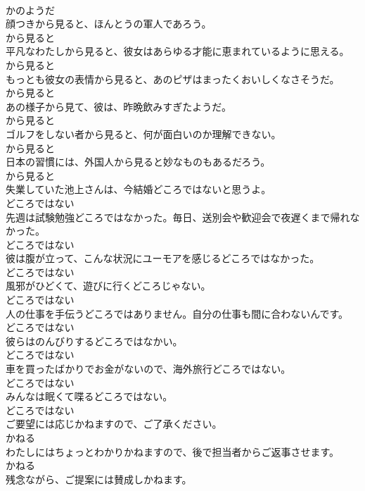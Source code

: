 \documentclass[8pt]{extreport}
\begin{document}
\begin{CJK}{UTF8}{min}
\\	かのようだ
\\	顔つきから見ると、ほんとうの軍人であろう。	
\\	から見ると
\\	平凡なわたしから見ると、彼女はあらゆる才能に恵まれているように思える。	
\\	から見ると
\\	もっとも彼女の表情から見ると、あのピザはまったくおいしくなさそうだ。	
\\	から見ると
\\	あの様子から見て、彼は、昨晩飲みすぎたようだ。	
\\	から見ると
\\	ゴルフをしない者から見ると、何が面白いのか理解できない。	
\\	から見ると
\\	日本の習慣には、外国人から見ると妙なものもあるだろう。	
\\	から見ると
\\	失業していた池上さんは、今結婚どころではないと思うよ。	
\\	どころではない
\\	先週は試験勉強どころではなかった。毎日、送別会や歓迎会で夜遅くまで帰れなかった。	
\\	どころではない
\\	彼は腹が立って、こんな状況にユーモアを感じるどころではなかった。	
\\	どころではない
\\	風邪がひどくて、遊びに行くどころじゃない。	
\\	どころではない
\\	人の仕事を手伝うどころではありません。自分の仕事も間に合わないんです。	
\\	どころではない
\\	彼らはのんびりするどころではなかい。	
\\	どころではない
\\	車を買ったばかりでお金がないので、海外旅行どころではない。	
\\	どころではない
\\	みんなは眠くて喋るどころではない。	
\\	どころではない
\\	ご要望には応じかねますので、ご了承ください。	
\\	かねる
\\	わたしにはちょっとわかりかねますので、後で担当者からご返事させます。	
\\	かねる
\\	残念ながら、ご提案には賛成しかねます。	

\end{CJK}
\end{document}
